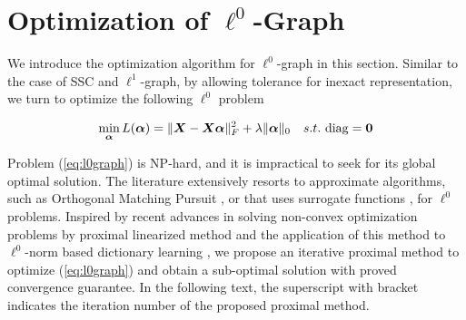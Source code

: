 \documentclass[10pt,twocolumn,letterpaper]{article}
\begin{document}
\section{Optimization of $\ell^{0}$-Graph}
We introduce the optimization algorithm for $\ell^{0}$-graph in this section. Similar to the case of SSC and $\ell^{1}$-graph, by allowing tolerance for inexact representation, we turn to optimize the following $\ell^{0}$ problem
\begin{small}\begin{align}\label{eq:l0graph}
\mathop {\min }\limits_{{\bm{\alpha}}} L(\bm{\alpha}) = {\|\bm X - \bm X \bm{\alpha}\|_F^2 + {\lambda}\|{\bm{\alpha}}\|_0} \quad s.t. \,\, {\rm diag} = \mathbf 0
\end{align}\end{small}
Problem (\ref{eq:l0graph}) is NP-hard, and it is impractical to seek for its global optimal solution. The literature extensively resorts to approximate algorithms, such as Orthogonal Matching Pursuit \cite{Tropp04}, or that uses surrogate functions \cite{Hyder09}, for $\ell^{0}$ problems. Inspired by recent advances in solving non-convex optimization problems by proximal linearized method \cite{BoltePAL2014} and the application of this method to $\ell^{0}$-norm based dictionary learning \cite{BaoJQS14}, we propose an iterative proximal method to optimize (\ref{eq:l0graph}) and obtain a sub-optimal solution with proved convergence guarantee. In the following text, the superscript with bracket indicates the iteration number of the proposed proximal method.
\end{document}
